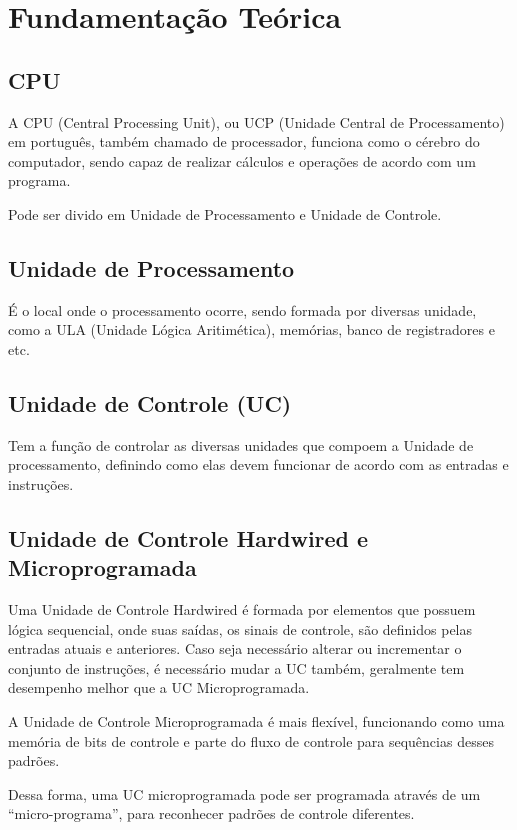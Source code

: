 \section{Fundamentação Teórica}

\subsection{CPU}

A CPU (Central Processing Unit), ou UCP (Unidade Central de
Processamento) em português, também chamado de processador, funciona
como o cérebro do computador, sendo capaz de realizar cálculos e operações
de acordo com um programa.

Pode ser divido em Unidade de Processamento e Unidade de Controle.

\subsection{Unidade de Processamento}

É o local onde o processamento ocorre, sendo formada por diversas
unidade, como a ULA (Unidade Lógica Aritimética), memórias, banco de
registradores e etc.

\subsection{Unidade de Controle (UC)}

Tem a função de controlar as diversas unidades que compoem a
Unidade de processamento, definindo como elas devem funcionar de acordo
com as entradas e instruções.

\subsection{Unidade de Controle Hardwired e Microprogramada}

Uma Unidade de Controle Hardwired é formada por elementos que
possuem lógica sequencial, onde suas saídas, os sinais de controle, são
definidos pelas entradas atuais e anteriores.
Caso seja necessário alterar ou incrementar o conjunto de instruções, é
necessário mudar a UC também, geralmente tem desempenho melhor que a
UC Microprogramada.

A Unidade de Controle Microprogramada é mais flexível, funcionando
como uma memória de bits de controle e parte do fluxo de controle para sequências desses padrões.

Dessa forma, uma UC microprogramada pode ser programada através
de um “micro-programa”, para reconhecer padrões de controle diferentes.

